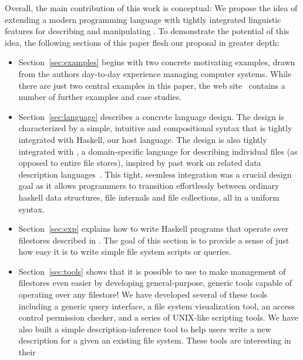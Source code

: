Overall, the main contribution of this work is
conceptual: We propose the idea of extending a modern programming
language with tightly integrated linguistic features for
describing and manipulating \filestores{}.  To demonstrate
the potential of this idea, the following sections of this paper
flesh our proposal in greater depth:

\begin{itemize}
\item Section~\ref{sec:examples} begins with two concrete motivating 
examples, drawn from the authors day-to-day experience managing
computer systems.  While there are just two central examples in this
paper, the \forest{} web site~\cite{forest-web-site} contains a number 
of further examples and case studies.~
\item Section~\ref{sec:language} describes a concrete language design.  
The design is characterized by a simple, 
intuitive and compositional syntax that is tightly integrated with
Haskell, our host language.  The design is also tightly integrated
with \padshaskell{}, a domain-specific language for describing 
individual
files (as opposed to entire file stores), inspired by past work
on related data description languages~\cite{fisher+:pads,fisher+:popl06,mandelbaum+:pads-ml,fisher+:toplas}.
This tight, seemless integration was a crucial design goal as it
allows programmers to transition effortlessly
between ordinary haskell data structures, file internals and 
file collections, all in a uniform syntax.
~
\item Section~\ref{sec:exp} explains how to write Haskell programs
that operate over filestores described in \forest.  The goal of this
section is to provide a sense of just how easy it is to write simple
file system scripts or queries.
\item Section~\ref{sec:tools} shows that it is possible to use \forest{}
to make management
of filestores even easier by developing general-purpose, generic
tools capable of operating over any filestore!  We have developed
several of these tools including a generic query interface, a file
system visualization tool, an access control permission checker, and a 
series of UNIX-like scripting tools.  We have also built a simple
description-inference tool to
help users write a new description for a given an existing file system.
These tools are interesting in their

\end{itemize}

